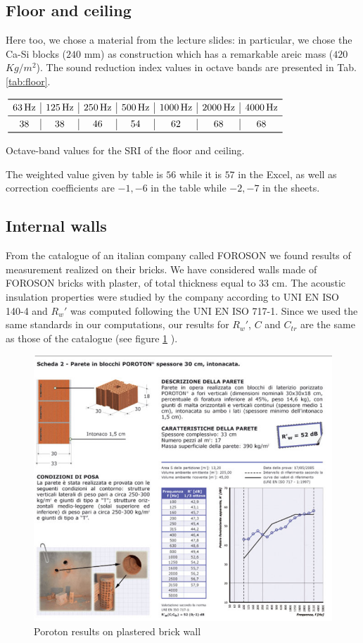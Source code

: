 \documentclass[]{scrartcl}
\begin{document}
\subsection{Floor and ceiling}
Here too, we chose a material from the lecture slides: in particular, we chose the Ca-Si blocks ($240$ mm) as construction which has a remarkable areic mass ($420$ $Kg/m^2$). The sound reduction index values in octave bands are presented in Tab. \ref{tab:floor}.
\begin{table}[h]
	\centering
	$\begin{array}{c|c|c|c|c|c|c}
		\toprule
		\SI{63}{\hertz} & \SI{125}{\hertz} & \SI{250}{\hertz}  & \SI{500}{\hertz}  & \SI{1000}{\hertz}  & \SI{2000}{\hertz} & \SI{4000}{\hertz} \\
		\midrule
		38 & 38 & 46 & 54 & 62 & 68 & 68 \\
		\bottomrule
	\end{array}$
	\caption{Octave-band values for the SRI of the floor and ceiling.}
	\label{tab:floor}
\end{table}

The weighted value given by table is $56$ while it is $57$ in the Excel, as well as correction coefficients are $-1,-6$ in the table while $-2,-7$ in the sheets. 

\subsection{Internal walls}
From the catalogue of an italian company called FOROSON we found results of measurement realized on their bricks. We have considered walls made of FOROSON bricks with plaster, of total thickness equal to $33$ cm. The acoustic insulation properties were studied by the company according to UNI EN ISO 140-4 and $R_w'$ was computed following the UNI EN ISO 717-1. Since we used the same standards in our computations, our results for $R_w'$, $C$ and $C_{tr}$ are the same as those of the catalogue (see figure \ref{fig:poroton} ).
\begin{figure}[h!]
	\centering
	\includegraphics[width=0.9\linewidth]{poroton}
	\caption{Poroton results on plastered brick wall}
	\label{fig:poroton}
\end{figure}
\end{document}
